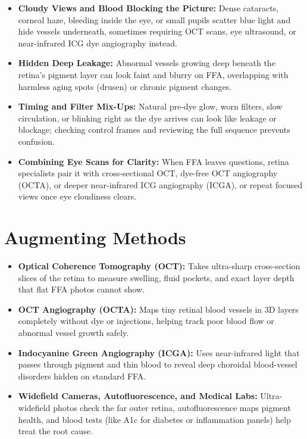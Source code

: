 \begin{itemize}
    \item \textbf{Cloudy Views and Blood Blocking the Picture:} Dense cataracts, corneal haze, bleeding inside the eye, or small pupils scatter blue light and hide vessels underneath, sometimes requiring OCT scans, eye ultrasound, or near-infrared ICG dye angiography instead.
    \item \textbf{Hidden Deep Leakage:} Abnormal vessels growing deep beneath the retina's pigment layer can look faint and blurry on FFA, overlapping with harmless aging spots (drusen) or chronic pigment changes.
    \item \textbf{Timing and Filter Mix-Ups:} Natural pre-dye glow, worn filters, slow circulation, or blinking right as the dye arrives can look like leakage or blockage; checking control frames and reviewing the full sequence prevents confusion.
    \item \textbf{Combining Eye Scans for Clarity:} When FFA leaves questions, retina specialists pair it with cross-sectional OCT, dye-free OCT angiography (OCTA), or deeper near-infrared ICG angiography (ICGA), or repeat focused views once eye cloudiness clears.
\end{itemize}

\section{Augmenting Methods}

\begin{itemize}
    \item \textbf{Optical Coherence Tomography (OCT):} Takes ultra-sharp cross-section slices of the retina to measure swelling, fluid pockets, and exact layer depth that flat FFA photos cannot show.
    \item \textbf{OCT Angiography (OCTA):} Maps tiny retinal blood vessels in 3D layers completely without dye or injections, helping track poor blood flow or abnormal vessel growth safely.
    \item \textbf{Indocyanine Green Angiography (ICGA):} Uses near-infrared light that passes through pigment and thin blood to reveal deep choroidal blood-vessel disorders hidden on standard FFA.
    \item \textbf{Widefield Cameras, Autofluorescence, and Medical Labs:} Ultra-widefield photos check the far outer retina, autofluorescence maps pigment health, and blood tests (like A1c for diabetes or inflammation panels) help treat the root cause.
\end{itemize}

